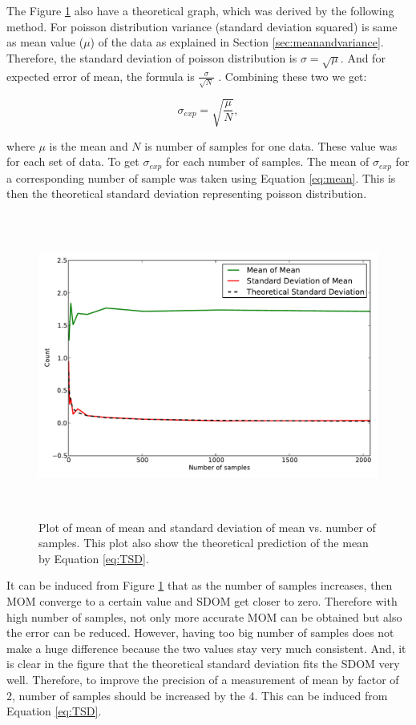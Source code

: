 \documentclass[a4paper,12pt]{article}
\begin{document}
The Figure \ref{fig:task9} also have a theoretical graph, which was derived by the following method. For poisson distribution variance (standard deviation squared) is same as mean value ($\mu$) of the data as explained in Section \ref{sec:meanandvariance}. Therefore, the standard deviation of poisson distribution is $\sigma = \sqrt{\mu}$. And for expected error of mean, the formula is $\frac{\sigma}{\sqrt{N}} $ \citep{error}. Combining these two we get:

\begin{equation}
\label{eq:TSD}
\sigma_{exp} = \sqrt{\frac{\mu}{N}},
\end{equation}

where $\mu$ is the mean and $N$ is number of samples for one data. These value was for each set of data. To get $\sigma_{exp}$ for each number of samples. The mean of $\sigma_{exp}$ for a corresponding number of sample was taken using Equation \ref{eq:mean}. This is then the theoretical standard deviation representing poisson distribution. 

\begin{figure}[H]
\centering
\includegraphics[angle=0,height=10cm,width=15.5cm]{graphs/task9.pdf}
\caption{Plot of mean of mean and standard deviation of mean vs. number of samples. This plot also show the theoretical prediction of the mean by Equation \ref {eq:TSD}.}
\label{fig:task9}
\end{figure}

It can be induced from Figure \ref{fig:task9} that as the number of samples increases, then MOM converge to a certain value and SDOM get closer to zero. Therefore with high number of samples, not only more accurate MOM can be obtained but also the error can be reduced. However, having too big number of samples does not make a huge difference because the two values stay very much consistent. And, it is clear in the figure that the theoretical standard deviation fits the SDOM very well. Therefore, to improve the precision of a measurement of mean by factor of 2, number of samples should be increased by the 4. This can be induced from Equation \ref {eq:TSD}. 
\end{document}
